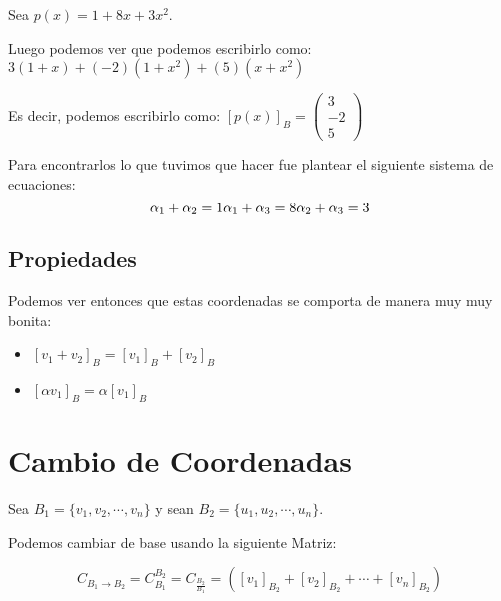\documentclass[12pt]{report}                                %
\begin{document}
        Sea $p(x) = 1+8x+3x^2$.

        Luego podemos ver que podemos escribirlo como:
        $3(1+x) + (-2)(1+x^2) + (5)(x+x^2)$

        Es decir, podemos escribirlo como:
        $[p(x)]_B =  \begin{pmatrix} 3\\-2\\5\end{pmatrix}$
         

        Para encontrarlos lo que tuvimos que hacer fue plantear el siguiente sistema de ecuaciones:
        \begin{equation*}
            \alpha_1 + \alpha_2 = 1  \\
            \alpha_1 + \alpha_3 = 8  \\
            \alpha_2 + \alpha_3 = 3  \\
        \end{equation*}


        \subsection{Propiedades}
        Podemos ver entonces que estas coordenadas se comporta de manera muy muy bonita:

        \begin{itemize}
            \item $[v_1 + v_2]_B = [v_1]_B + [v_2]_B$
            \item $[\alpha v_1]_B = \alpha [v_1]_B$
        \end{itemize}



    \clearpage
    \section{Cambio de Coordenadas}

        Sea $B_1 = \{v_1,v_2, \cdots, v_n\}$ y sean  $B_2 = \{u_1,u_2, \cdots, u_n\}$.

        Podemos cambiar de base usando la siguiente Matriz:

        \begin{equation*}
            C_{B_1 \to B_2}= C_{B_1}^{B_2} = C_{\frac{B_2}{B_1}} = \left( [v_1]_{B_2} + [v_2]_{B_2} + \cdots + [v_n]_{B_2}   \right)
        \end{equation*}
\end{document}
